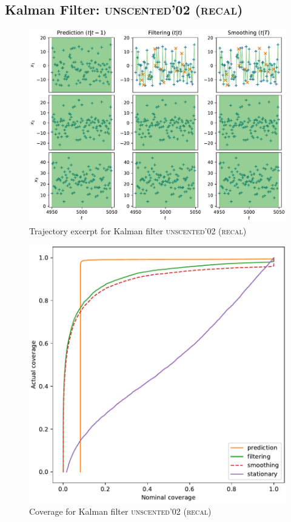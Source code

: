 \subsection{Kalman Filter: {\textsc{unscented'02 (recal)}}}
\begin{figure}[H]
\begin{center}
\includegraphics[width=\linewidth]{generated/trajectory/Method.UNSCENTED1-Recalibrate.YES.pdf}
\end{center}
\caption{Trajectory excerpt for Kalman filter \textsc{{\textsc{unscented'02 (recal)}}}}
\end{figure}
\begin{figure}[H]
\begin{center}
\includegraphics[width=\linewidth]{generated/coverage/Method.UNSCENTED1-Recalibrate.YES.pdf}
\end{center}
\caption{Coverage for Kalman filter \textsc{{\textsc{unscented'02 (recal)}}}}
\end{figure}
